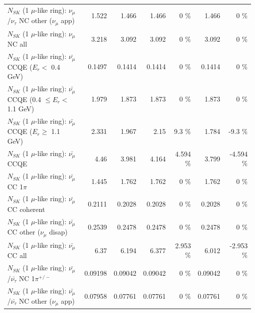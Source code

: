 \begin{table}
\begin{tabular}{| l | r | r | r  r | r  r |}
     $N_{SK}$ (1 $\mu$-like ring): $\nu_\mu$/$\nu_\tau$ NC other ($\nu_\mu$ app) &           1.522 &           1.466 &           1.466 &        0 \%  &           1.466 &        0 \%  \\ 
                                $N_{SK}$ (1 $\mu$-like ring): $\nu_{\mu}$ NC all &           3.218 &           3.092 &           3.092 &        0 \%  &           3.092 &        0 \%  \\ 
\hline
\hline
\hline
          $N_{SK}$ (1 $\mu$-like ring): $\bar{\nu_\mu}$ CCQE ($E_{r} <$ 0.4 GeV) &          0.1497 &          0.1414 &          0.1414 &        0 \%  &          0.1414 &        0 \%  \\ 
 $N_{SK}$ (1 $\mu$-like ring): $\bar{\nu_\mu}$ CCQE (0.4 $\leq E_{r} <$ 1.1 GeV) &           1.979 &           1.873 &           1.873 &        0 \%  &           1.873 &        0 \%  \\ 
       $N_{SK}$ (1 $\mu$-like ring): $\bar{\nu_\mu}$ CCQE ($E_{r} \geq$ 1.1 GeV) &           2.331 &           1.967 &            2.15 &      9.3 \%  &           1.784 &     -9.3 \%  \\ 
\hline
                              $N_{SK}$ (1 $\mu$-like ring): $\bar{\nu_\mu}$ CCQE &            4.46 &           3.981 &           4.164 &    4.594 \%  &           3.799 &   -4.594 \%  \\ 
                         $N_{SK}$ (1 $\mu$-like ring): $\bar{\nu_\mu}$ CC 1$\pi$ &           1.445 &           1.762 &           1.762 &        0 \%  &           1.762 &        0 \%  \\ 
                       $N_{SK}$ (1 $\mu$-like ring): $\bar{\nu_\mu}$ CC coherent &          0.2111 &          0.2028 &          0.2028 &        0 \%  &          0.2028 &        0 \%  \\ 
        $N_{SK}$ (1 $\mu$-like ring): $\bar{\nu_\mu}$ CC other ($\nu_\mu$ disap) &          0.2539 &          0.2478 &          0.2478 &        0 \%  &          0.2478 &        0 \%  \\ 
                          $N_{SK}$ (1 $\mu$-like ring): $\bar{\nu_{\mu}}$ CC all &            6.37 &           6.194 &           6.377 &    2.953 \%  &           6.012 &   -2.953 \%  \\ 
\hline
  $N_{SK}$ (1 $\mu$-like ring): $\bar{\nu_\mu}$/$\bar{\nu_\tau}$ NC 1$\pi^{+/-}$ &         0.09198 &         0.09042 &         0.09042 &        0 \%  &         0.09042 &        0 \%  \\ 
$N_{SK}$ (1 $\mu$-like ring): $\bar{\nu_\mu}$/$\bar{\nu_\tau}$ NC other ($\nu_\mu$ app) &         0.07958 &         0.07761 &         0.07761 &        0 \%  &         0.07761 &        0 \%  \\ 

\end{tabular}
\end{table}
